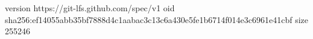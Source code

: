 version https://git-lfs.github.com/spec/v1
oid sha256:ef14055abb35bf7888d4c1aabac3c13c6a430e5fe1b6714f014e3c6961e41cbf
size 255246
